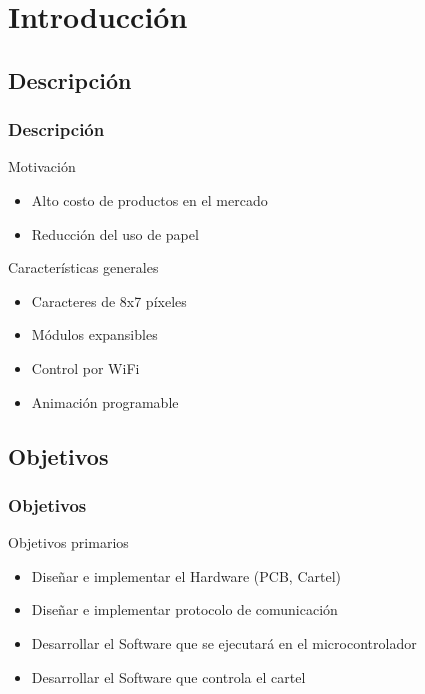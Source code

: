 \section{Introducción} 

\subsection{Descripción}
 

\newcommand\cantLetrasRenglon{3}

\begin{frame}
	\frametitle{Descripción}
	
		\begin{block}{Motivación}
			\begin{itemize}
				\item Alto costo de productos en el mercado
				\item Reducción del uso de papel
			\end{itemize}
		\end{block}

		\begin{block}{Características generales}
			\begin{itemize}
				\item Caracteres de 8x7 píxeles
				\item Módulos expansibles
				\item Control por WiFi
				\item Animación programable
			\end{itemize}
		\end{block}

\end{frame}

\subsection{Objetivos}
\begin{frame}
	\frametitle{Objetivos}
	\begin{block}{Objetivos primarios}
		\begin{itemize}
			\item Diseñar e implementar el Hardware (PCB, Cartel)
			\item Diseñar e implementar protocolo de comunicación
			\item Desarrollar el Software que se ejecutará en el microcontrolador
			\item Desarrollar el Software que controla el cartel
		\end{itemize}
	\end{block}
\end{frame}

